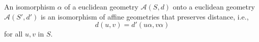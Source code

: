 An isomorphism $\alpha$ of a euclidean geometry $\mathcal{A}(S, d)$ onto a euclidean geometry $\mathcal{A}(S', d')$ is an isomorphism of affine geometries that preserves distance, i.e.,
$$d(u, v) = d'(u\alpha, v\alpha)$$
for all $u, v$ in $S$.
